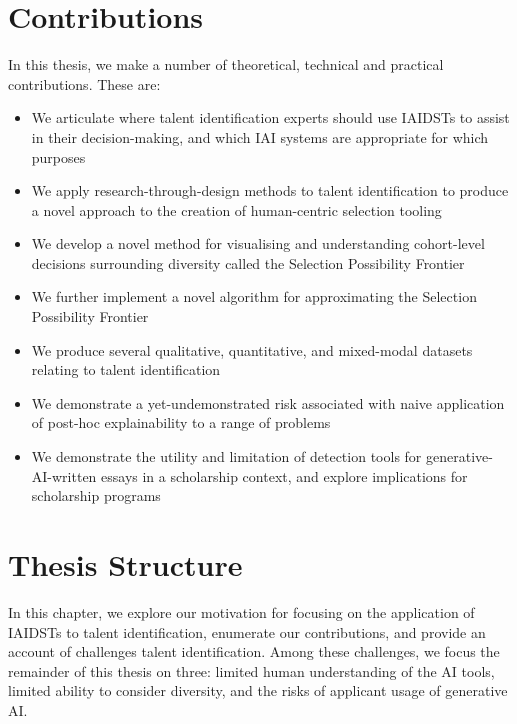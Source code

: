 \section{Contributions}
In this thesis, we make a number of theoretical, technical and practical contributions. These are:

\begin{itemize}
    \item We articulate where talent identification experts should use IAIDSTs to assist in their decision-making, and which IAI systems are appropriate for which purposes
    \item We apply research-through-design methods to talent identification to produce a novel approach to the creation of human-centric selection tooling
    \item We develop a novel method for visualising and understanding cohort-level decisions surrounding diversity called the Selection Possibility Frontier
    \item We further implement a novel algorithm for approximating the Selection Possibility Frontier
    \item We produce several qualitative, quantitative, and mixed-modal datasets relating to talent identification
    \item We demonstrate a yet-undemonstrated risk associated with naive application of post-hoc explainability to a range of problems
    \item We demonstrate the utility and limitation of detection tools for generative-AI-written essays in a scholarship context, and explore implications for scholarship programs
\end{itemize}

\section{Thesis Structure}
In this chapter, we explore our motivation for focusing on the application of IAIDSTs to talent identification, enumerate our contributions, and provide an account of challenges talent identification. Among these challenges, we focus the remainder of this thesis on three: limited human understanding of the AI tools, limited ability to consider diversity, and the risks of applicant usage of generative AI.


